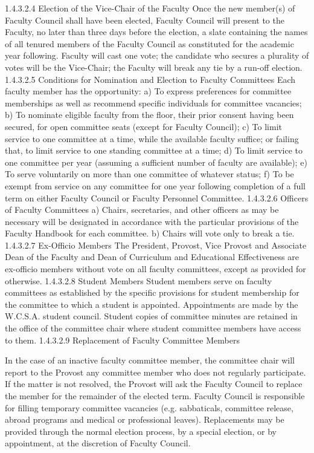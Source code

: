\documentclass[letterpaper, 11pt]{article}
\begin{document}
				1.4.3.2.4 Election of the Vice-Chair of the Faculty
				Once the new member(s) of Faculty Council shall have been elected, Faculty Council will present to the Faculty, no later than three days before the election, a slate containing the names of all tenured members of the Faculty Council as constituted for the academic year following.  Faculty will cast one vote; the candidate who secures a plurality of votes will be the Vice-Chair; the Faculty will break any tie by a run-off election.
				1.4.3.2.5 Conditions for Nomination and Election to Faculty Committees
				Each faculty member has the opportunity:
				a) To express preferences for committee memberships as well as recommend specific individuals for committee vacancies;
				b) To nominate eligible faculty from the floor, their prior consent having been secured, for open committee seats (except for Faculty Council);
				c) To limit service to one committee at a time, while the available faculty suffice; or failing that, to limit service to one standing committee at a time;
				d) To limit service to one committee per year (assuming a sufficient number of faculty are available);
				e) To serve voluntarily on more than one committee of whatever status;
				f) To be exempt from service on any committee for one year following completion of a full term on either Faculty Council or Faculty Personnel Committee.
				1.4.3.2.6 Officers of Faculty Committees
				a) Chairs, secretaries, and other officers as may be necessary will be designated in accordance with the particular provisions of the Faculty Handbook for each committee.
				b) Chairs will vote only to break a tie.
				1.4.3.2.7 Ex-Officio Members
				The President, Provost, Vice Provost and Associate Dean of the Faculty and Dean of Curriculum and Educational Effectiveness are ex-officio members without vote on all faculty committees, except as provided for otherwise.
				1.4.3.2.8 Student Members
				Student members serve on faculty committees as established by the specific provisions for student membership for the committee to which a student is appointed. Appointments are made by the W.C.S.A. student council.  Student copies of committee minutes are retained in the office of the committee chair where student committee members have access to them.
				1.4.3.2.9 Replacement of Faculty Committee Members

				In the case of an inactive faculty committee member, the committee chair will report to the Provost any committee member who does not regularly participate.  If the matter is not resolved, the Provost will ask the Faculty Council to replace the member for the remainder of the elected term.
				Faculty Council is responsible for filling temporary committee vacancies (e.g. sabbaticals, committee release, abroad programs and medical or professional leaves).  Replacements may be provided through the normal election process, by a special election, or by appointment, at the discretion of Faculty Council.
\end{document}
